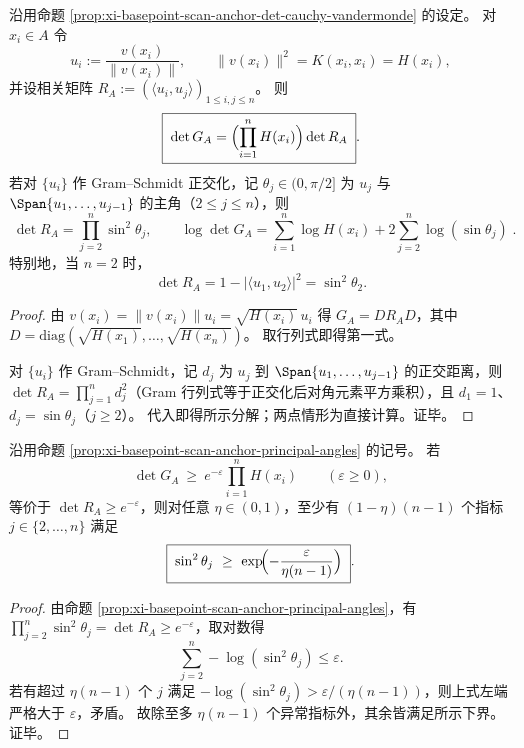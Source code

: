 \begin{proposition}\label{prop:xi-basepoint-scan-anchor-principal-angles}
沿用命题 \ref{prop:xi-basepoint-scan-anchor-det-cauchy-vandermonde} 的设定。
对 \(x_i\in A\) 令
\[
u_i:=\frac{v(x_i)}{\|v(x_i)\|},\qquad
\|v(x_i)\|^2=K(x_i,x_i)=H(x_i),
\]
并设相关矩阵 \(R_A:=(\langle u_i,u_j\rangle)_{1\le i,j\le n}\)。
则
\[
\boxed{\;
\det G_A=\Bigl(\prod_{i=1}^{n}H(x_i)\Bigr)\det R_A\; }.
\]
若对 \(\{u_i\}\) 作 Gram--Schmidt 正交化，记 \(\theta_j\in(0,\pi/2]\) 为 \(u_j\) 与 \(\Span\{u_1,\dots,u_{j-1}\}\) 的主角（\(2\le j\le n\)），则
\[
\boxed{\;
\det R_A=\prod_{j=2}^{n}\sin^2\theta_j,\qquad
\log\det G_A=\sum_{i=1}^{n}\log H(x_i)+2\sum_{j=2}^{n}\log(\sin\theta_j)\; }.
\]
特别地，当 \(n=2\) 时，
\[
\det R_A=1-|\langle u_1,u_2\rangle|^2=\sin^2\theta_2.
\]
\end{proposition}
\begin{proof}
由 \(v(x_i)=\|v(x_i)\|u_i=\sqrt{H(x_i)}\,u_i\) 得 \(G_A=DR_AD\)，其中 \(D=\mathrm{diag}(\sqrt{H(x_1)},\dots,\sqrt{H(x_n)})\)。
取行列式即得第一式。
\par
对 \(\{u_i\}\) 作 Gram--Schmidt，记 \(d_j\) 为 \(u_j\) 到 \(\Span\{u_1,\dots,u_{j-1}\}\) 的正交距离，则 \(\det R_A=\prod_{j=1}^{n}d_j^2\)（Gram 行列式等于正交化后对角元素平方乘积），且 \(d_1=1\)、\(d_j=\sin\theta_j\)（\(j\ge 2\)）。
代入即得所示分解；两点情形为直接计算。证毕。
\end{proof}

\begin{corollary}\label{cor:xi-basepoint-scan-anchor-angle-concentration}
沿用命题 \ref{prop:xi-basepoint-scan-anchor-principal-angles} 的记号。
若
\[
\det G_A\ \ge\ e^{-\varepsilon}\prod_{i=1}^{n}H(x_i)\qquad(\varepsilon\ge 0),
\]
等价于 \(\det R_A\ge e^{-\varepsilon}\)，则对任意 \(\eta\in(0,1)\)，至少有 \((1-\eta)(n-1)\) 个指标 \(j\in\{2,\dots,n\}\) 满足
\[
\boxed{\;
\sin^2\theta_j\ \ge\ \exp\!\Bigl(-\frac{\varepsilon}{\eta(n-1)}\Bigr)\; }.
\]
\end{corollary}
\begin{proof}
由命题 \ref{prop:xi-basepoint-scan-anchor-principal-angles}，有 \(\prod_{j=2}^{n}\sin^2\theta_j=\det R_A\ge e^{-\varepsilon}\)，取对数得
\[
\sum_{j=2}^{n}-\log(\sin^2\theta_j)\le \varepsilon.
\]
若有超过 \(\eta(n-1)\) 个 \(j\) 满足 \(-\log(\sin^2\theta_j)>\varepsilon/(\eta(n-1))\)，则上式左端严格大于 \(\varepsilon\)，矛盾。
故除至多 \(\eta(n-1)\) 个异常指标外，其余皆满足所示下界。证毕。
\end{proof}

